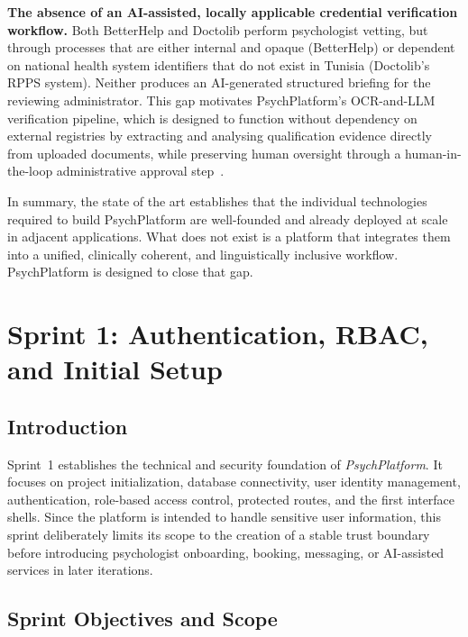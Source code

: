 \documentclass[a4paper,12pt]{report}
\begin{document}
\textbf{The absence of an AI-assisted, locally applicable credential verification
workflow.} Both BetterHelp and Doctolib perform psychologist vetting, but through
processes that are either internal and opaque (BetterHelp) or dependent on national
health system identifiers that do not exist in Tunisia (Doctolib's RPPS system). Neither
produces an AI-generated structured briefing for the reviewing administrator. This gap
motivates PsychPlatform's OCR-and-LLM verification pipeline, which is designed to
function without dependency on external registries by extracting and analysing
qualification evidence directly from uploaded documents, while preserving human
oversight through a human-in-the-loop administrative approval step~\cite{Dellermann2019}.
 
In summary, the state of the art establishes that the individual technologies required
to build PsychPlatform are well-founded and already deployed at scale in adjacent
applications. What does not exist is a platform that integrates them into a unified,
clinically coherent, and linguistically inclusive workflow. PsychPlatform is designed
to close that gap.


\chapter{Sprint 1: Authentication, RBAC, and Initial Setup}
\label{chap:sprint1-auth}

\section*{Introduction}
{}

Sprint~1 establishes the technical and security foundation of \emph{PsychPlatform}. It focuses on project initialization, database connectivity, user identity management, authentication, role-based access control, protected routes, and the first interface shells. Since the platform is intended to handle sensitive user information, this sprint deliberately limits its scope to the creation of a stable trust boundary before introducing psychologist onboarding, booking, messaging, or AI-assisted services in later iterations.

\section{Sprint Objectives and Scope}
\label{sec:sprint1-objectives}
\end{document}
